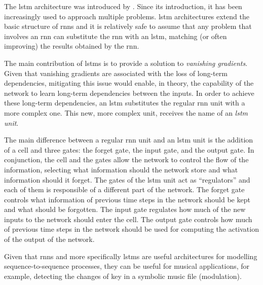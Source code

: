 

The \gls{lstm} architecture was introduced by
\textcite{hochreiter1997long}. Since its introduction, it
has been increasingly used to approach multiple problems.
\gls{lstm} architectures extend the basic structure of
\glspl{rnn} and it is relatively safe to assume that any
problem that involves an \gls{rnn} can substitute the
\gls{rnn} with an \gls{lstm}, matching (or often improving)
the results obtained by the \gls{rnn}.

The main contribution of \glspl{lstm} is to provide a
solution to \emph{vanishing gradients}. Given that vanishing
gradients are associated with the loss of long-term
dependencies, mitigating this issue would enable, in theory,
the capability of the network to learn long-term
dependencies between the inputs. In order to achieve these
long-term dependencies, an \gls{lstm} substitutes the
regular \gls{rnn} unit with a more complex one. This new,
more complex unit, receives the name of an \emph{\gls{lstm}
unit}.

The main difference between a regular \gls{rnn} unit and an
\gls{lstm} unit is the addition of a cell and three gates:
the forget gate, the input gate, and the output gate. In
conjunction, the cell and the gates allow the network to
control the flow of the information, selecting what
information should the network store and what information
should it forget. The gates of the \gls{lstm} unit act as
``regulators'' and each of them is responsible of a
different part of the network. The forget gate controls what
information of previous time steps in the network should be
kept and what should be forgotten. The input gate regulates
how much of the new inputs to the network should enter the
cell. The output gate controls how much of previous time
steps in the network should be used for computing the
activation of the output of the network.

Given that \glspl{rnn} and more specifically \glspl{lstm}
are useful architectures for modelling sequence-to-sequence
processes, they can be useful for musical applications, for
example, detecting the changes of key in a symbolic music
file (modulation).


